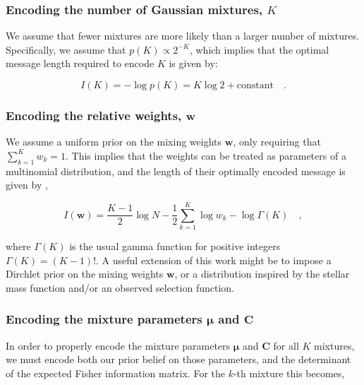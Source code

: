 \documentclass{aastex61}
\newcommand{\vect}[1]{\boldsymbol{\mathbf{#1}}}
\def\veccov{\vect{C}}
\def\vecmean{\vect{\mu}}
\def\weight{w}
\def\weights{\vect{\weight}}
\begin{document}
\subsubsection{Encoding the number of Gaussian mixtures, $K$}
\label{sec:encoding-k}


We assume that fewer mixtures are more likely than a larger number of mixtures.
Specifically, we assume that $p(K) \propto 2^{-K}$, which implies that the
optimal message length required to encode $K$ is given by:

\begin{equation}
  I(K) = -\log{p(K)} = K\log{2} + \textrm{constant} \quad .
\end{equation}


\subsubsection{Encoding the relative weights, $\weights$}
\label{sec:encoding-weights}

We assume a uniform prior on the mixing weights $\bm{w}$, only requiring that
$\sum_{k=1}^{K}w_k = 1$. 
This implies that the weights can be treated as parameters of a multinomial
distribution, and the length of their optimally encoded message is given by
\citet{Boulton_1969},

\begin{equation}
  I(\weights) 
    = \frac{K - 1}{2}\log{N} 
    - \frac{1}{2}\sum_{k=1}^{K}\log\weight_k 
    - \log{\Gamma{\left(K\right)}} \quad ,
\end{equation}

\noindent{}where $\Gamma(K)$ is the usual gamma function for positive integers
$\Gamma(K) = (K - 1)!$.
A useful extension of this work might be to impose a Dirchlet prior on the 
mixing weights $\weights$, or a distribution inspired by the stellar mass 
function and/or an observed selection function.


\subsubsection{Encoding the mixture parameters $\vecmean$ and $\veccov$}
\label{sec:encoding-mixture-parameters}


In order to properly encode the mixture parameters $\vecmean$ and $\veccov$
for all $K$ mixtures, we must encode both our prior belief on those parameters,
and the determinant of the expected Fisher information matrix.
For the $k$-th mixture this becomes,
\end{document}
